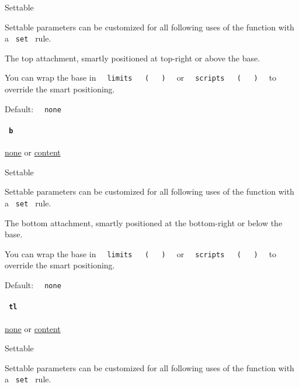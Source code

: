 {{ Settable }}

\label{functions-attach-t-settable-tooltip}
Settable parameters can be customized for all following uses of the
function with a \texttt{\ set\ } rule.

The top attachment, smartly positioned at top-right or above the base.

You can wrap the base in
\texttt{\ }{\texttt{\ limits\ }}\texttt{\ }{\texttt{\ (\ }}\texttt{\ }{\texttt{\ )\ }}\texttt{\ }
or
\texttt{\ }{\texttt{\ scripts\ }}\texttt{\ }{\texttt{\ (\ }}\texttt{\ }{\texttt{\ )\ }}\texttt{\ }
to override the smart positioning.

Default: \texttt{\ }{\texttt{\ none\ }}\texttt{\ }

\paragraph{\texorpdfstring{\texttt{\ b\ }}{ b }}\label{functions-attach-b}

\href{/docs/reference/foundations/none/}{none} {or}
\href{/docs/reference/foundations/content/}{content}

{{ Settable }}

\label{functions-attach-b-settable-tooltip}
Settable parameters can be customized for all following uses of the
function with a \texttt{\ set\ } rule.

The bottom attachment, smartly positioned at the bottom-right or below
the base.

You can wrap the base in
\texttt{\ }{\texttt{\ limits\ }}\texttt{\ }{\texttt{\ (\ }}\texttt{\ }{\texttt{\ )\ }}\texttt{\ }
or
\texttt{\ }{\texttt{\ scripts\ }}\texttt{\ }{\texttt{\ (\ }}\texttt{\ }{\texttt{\ )\ }}\texttt{\ }
to override the smart positioning.

Default: \texttt{\ }{\texttt{\ none\ }}\texttt{\ }

\paragraph{\texorpdfstring{\texttt{\ tl\ }}{ tl }}\label{functions-attach-tl}

\href{/docs/reference/foundations/none/}{none} {or}
\href{/docs/reference/foundations/content/}{content}

{{ Settable }}

\label{functions-attach-tl-settable-tooltip}
Settable parameters can be customized for all following uses of the
function with a \texttt{\ set\ } rule.

